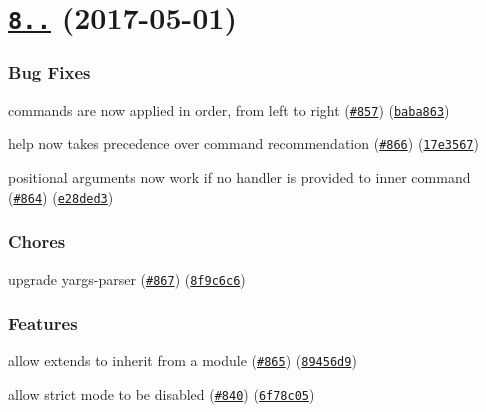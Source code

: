 \label{_8.0.0}%
 \section*{\href{https://github.com/yargs/yargs/compare/v7.1.0...v8.0.0}{\tt 8..} (2017-\/05-\/01)}

\subsubsection*{Bug Fixes}


\begin{DoxyItemize}
\item commands are now applied in order, from left to right (\href{https://github.com/yargs/yargs/issues/857}{\tt \#857}) (\href{https://github.com/yargs/yargs/commit/baba863}{\tt baba863})
\item help now takes precedence over command recommendation (\href{https://github.com/yargs/yargs/issues/866}{\tt \#866}) (\href{https://github.com/yargs/yargs/commit/17e3567}{\tt 17e3567})
\item positional arguments now work if no handler is provided to inner command (\href{https://github.com/yargs/yargs/issues/864}{\tt \#864}) (\href{https://github.com/yargs/yargs/commit/e28ded3}{\tt e28ded3})
\end{DoxyItemize}

\subsubsection*{Chores}


\begin{DoxyItemize}
\item upgrade yargs-\/parser (\href{https://github.com/yargs/yargs/issues/867}{\tt \#867}) (\href{https://github.com/yargs/yargs/commit/8f9c6c6}{\tt 8f9c6c6})
\end{DoxyItemize}

\subsubsection*{Features}


\begin{DoxyItemize}
\item allow extends to inherit from a module (\href{https://github.com/yargs/yargs/issues/865}{\tt \#865}) (\href{https://github.com/yargs/yargs/commit/89456d9}{\tt 89456d9})
\item allow strict mode to be disabled (\href{https://github.com/yargs/yargs/issues/840}{\tt \#840}) (\href{https://github.com/yargs/yargs/commit/6f78c05}{\tt 6f78c05})
\end{DoxyItemize}


